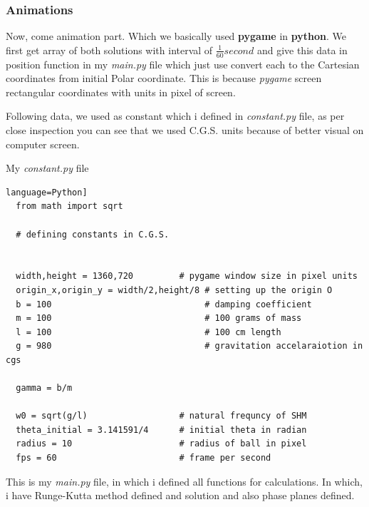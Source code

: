 \documentclass[11pt,a4paper]{article}
\begin{document}
\subsubsection{Animations}
\label{sec:org0c22d84}

Now, come animation part. Which we basically used \textbf{pygame} in \textbf{python}. We first get array of both solutions with interval of \(\frac{1}{60} second\) and give this data in position function in my \emph{main.py} file which just use convert each to the Cartesian coordinates from initial Polar coordinate. This is because \emph{pygame} screen rectangular coordinates with units in pixel of screen.

Following data, we used as constant which i defined in \emph{constant.py} file, as per close inspection you can see that we used C.G.S. units because of better visual on computer screen.

My \emph{constant.py} file

\begin{lstlisting}language=Python]
  from math import sqrt

  # defining constants in C.G.S.


  width,height = 1360,720         # pygame window size in pixel units
  origin_x,origin_y = width/2,height/8 # setting up the origin O
  b = 100                              # damping coefficient
  m = 100                              # 100 grams of mass
  l = 100                              # 100 cm length
  g = 980                              # gravitation accelaraiotion in cgs

  gamma = b/m

  w0 = sqrt(g/l)                  # natural frequncy of SHM
  theta_initial = 3.141591/4      # initial theta in radian
  radius = 10                     # radius of ball in pixel
  fps = 60                        # frame per second
\end{lstlisting}

This is my \emph{main.py} file, in which i defined all functions for calculations. In which, i have Runge-Kutta method defined and solution and also phase planes defined.
\end{document}
